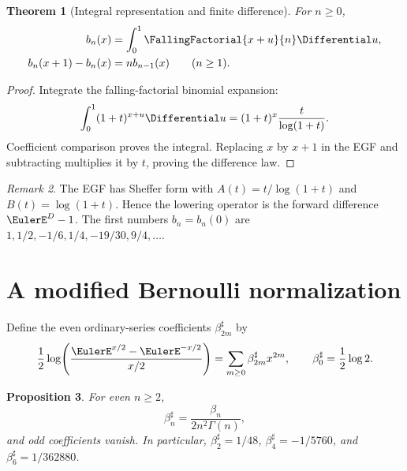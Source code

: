 \documentclass[11pt,a4paper,oneside,openany]{book}
\newtheorem{theorem}{Theorem}[chapter]
\newtheorem{proposition}[theorem]{Proposition}
\theoremstyle{definition}
\theoremstyle{remark}
\newtheorem{remark}[theorem]{Remark}
\begin{document}
\begin{theorem}[Integral representation and finite difference]
\label{thm:merged-cauchy-polynomials}
For $n\geq0$,
\begin{align}
 b_n(x)&=\int_0^1\FallingFactorial{x+u}{n}\Differential u,                             \label{eq:merged-cauchy-integral}\\
 b_n(x+1)-b_n(x)&=n b_{n-1}(x)\qquad(n\geq1).                       \label{eq:merged-cauchy-difference}
\end{align}
\end{theorem}

\begin{proof}
Integrate the falling-factorial binomial expansion:
\[
 \int_0^1(1+t)^{x+u}\Differential u
 =(1+t)^x\frac{t}{\log(1+t)}.
\]
Coefficient comparison proves the integral.  Replacing $x$ by $x+1$ in the
EGF and subtracting multiplies it by $t$, proving the difference law.
\end{proof}

\begin{remark}
The EGF has Sheffer form with
$A(t)=t/\log(1+t)$ and $B(t)=\log(1+t)$.  Hence the lowering operator is the
forward difference $\EulerE^D-1$.  The first numbers $b_n=b_n(0)$ are
$1,1/2,-1/6,1/4,-19/30,9/4,\ldots$.
\end{remark}

\section{A modified Bernoulli normalization}

Define the even ordinary-series coefficients $\beta_{2m}^{\sharp}$ by
\begin{equation}
 \frac12\log\!\left(\frac{\EulerE^{x/2}-\EulerE^{-x/2}}{x/2}\right)
 =\sum_{m\geq0}\beta_{2m}^{\sharp}x^{2m},
 \qquad \beta_0^{\sharp}=\frac12\log2.                              \label{eq:merged-modified-bernoulli-def}
\end{equation}

\begin{proposition}
For even $n\geq2$,
\begin{equation}
 \beta_n^{\sharp}=\frac{\beta_n}{2n^2\Gamma(n)},                    \label{eq:merged-modified-bernoulli}
\end{equation}
and odd coefficients vanish.  In particular,
$\beta_2^{\sharp}=1/48$, $\beta_4^{\sharp}=-1/5760$, and
$\beta_6^{\sharp}=1/362880$.
\end{proposition}
\end{document}
